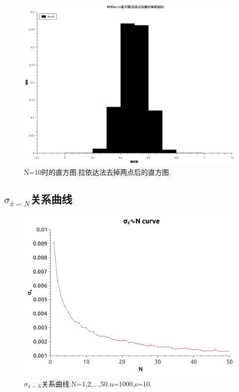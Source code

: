 \documentclass[10pt,a4paper]{article}
\begin{document}
\begin{figure}[H]
\begin{minipage}[b]{0.5\linewidth}
\includegraphics[width=\textwidth]{../result/Table3.png}
\caption{N=10时的直方图.拉依达法去掉两点后的直方图.}
\label{fig:3}
\end{minipage}
\end{figure}
\subsection{$\sigma_{\bar{x} \backsim N}$关系曲线}
\begin{figure}[H]
\centering
\includegraphics[width=\textwidth]{../result/Graph3.png}
\caption{$\sigma_{\bar{x} \backsim N}$关系曲线.N=1,2,...,50.n=1000,s=10.}
\end{figure}
\end{document}
